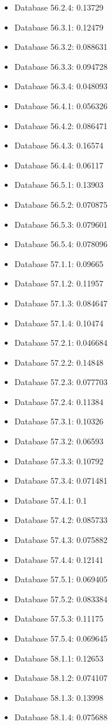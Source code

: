 \begin{itemize}
\item Database 56.2.4: 0.13729
\item Database 56.3.1: 0.12479
\item Database 56.3.2: 0.088631
\item Database 56.3.3: 0.094728
\item Database 56.3.4: 0.048093
\item Database 56.4.1: 0.056326
\item Database 56.4.2: 0.086471
\item Database 56.4.3: 0.16574
\item Database 56.4.4: 0.06117
\item Database 56.5.1: 0.13903
\item Database 56.5.2: 0.070875
\item Database 56.5.3: 0.079601
\item Database 56.5.4: 0.078096
\item Database 57.1.1: 0.09665
\item Database 57.1.2: 0.11957
\item Database 57.1.3: 0.084647
\item Database 57.1.4: 0.10474
\item Database 57.2.1: 0.046684
\item Database 57.2.2: 0.14848
\item Database 57.2.3: 0.077703
\item Database 57.2.4: 0.11384
\item Database 57.3.1: 0.10326
\item Database 57.3.2: 0.06593
\item Database 57.3.3: 0.10792
\item Database 57.3.4: 0.071481
\item Database 57.4.1: 0.1
\item Database 57.4.2: 0.085733
\item Database 57.4.3: 0.075882
\item Database 57.4.4: 0.12141
\item Database 57.5.1: 0.069405
\item Database 57.5.2: 0.083384
\item Database 57.5.3: 0.11175
\item Database 57.5.4: 0.069645
\item Database 58.1.1: 0.12653
\item Database 58.1.2: 0.074107
\item Database 58.1.3: 0.13998
\item Database 58.1.4: 0.075688

\end{itemize}
